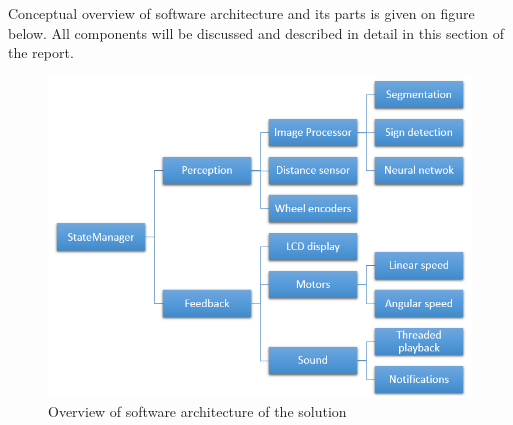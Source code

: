 
Conceptual overview of software architecture and its parts is given on figure below. All components will be discussed and described in detail in this section of the report. 

\begin{figure}[th!]
\center
\includegraphics[scale=0.7]{images/software-architecture.png}
\caption{Overview of software architecture of the solution}
\end{figure}


